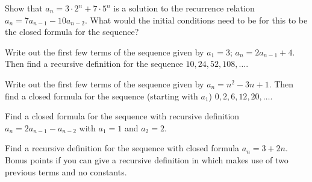 \documentclass[11pt,]{book}
\theoremstyle{ptxplainnotitle}
\theoremstyle{ptxplaintitle}
\theoremstyle{ptxdefinitionnotitle}
\theoremstyle{ptxdefinitiontitle}
\theoremstyle{ptxdefinitionnotitle}
\theoremstyle{ptxdefinitiontitle}
\theoremstyle{ptxdefinitionnotitle}
\theoremstyle{ptxdefinitiontitle}
\theoremstyle{ptxdefinitiontitlenonumber}
\theoremstyle{ptxdefinitiontitlenonumber}
\numberwithin{equation}{chapter}
\begin{document}
\begin{divisionexercise}{6}\hypertarget{exercise-6}{}
\hypertarget{p-138}{}%
Show that \(a_n = 3\cdot 2^n + 7\cdot 5^n\) is a solution to the recurrence relation \(a_n = 7a_{n-1} - 10a_{n-2}\).   What would the initial conditions need to be for this to be the closed formula for the sequence?%
\end{divisionexercise}%
\begin{divisionexercise}{7}\hypertarget{exercise-7}{}
\hypertarget{p-139}{}%
Write out the first few terms of the sequence given by \(a_1 = 3\); \(a_n = 2a_{n-1} + 4\). Then find a recursive definition for the sequence \(10, 24, 52, 108, \ldots\).%
\end{divisionexercise}%
\begin{divisionexercise}{8}\hypertarget{exercise-8}{}
\hypertarget{p-140}{}%
Write out the first few terms of the sequence given by \(a_n = n^2 - 3n + 1\). Then find a closed formula for the sequence (starting with \(a_1\)) \(0, 2, 6, 12, 20, \ldots\).%
\end{divisionexercise}%
\begin{divisionexercise}{9}\hypertarget{exercise-9}{}
\hypertarget{p-141}{}%
Find a closed formula for the sequence with recursive definition \(a_n = 2a_{n-1} - a_{n-2}\) with \(a_1 = 1\) and \(a_2 = 2\).%
\end{divisionexercise}%
\begin{divisionexercise}{10}\hypertarget{exercise-10}{}
\hypertarget{p-142}{}%
Find a recursive definition for the sequence with closed formula \(a_n = 3 + 2n\). Bonus points if you can give a recursive definition in which makes use of two previous terms and no constants.%
\end{divisionexercise}%
\end{document}
